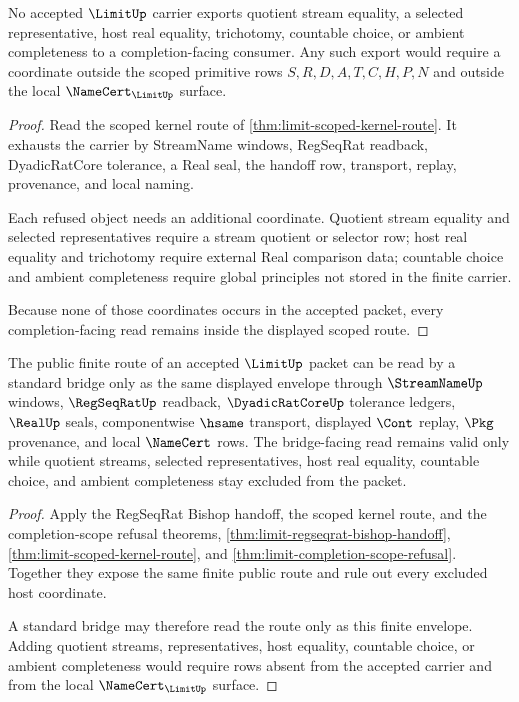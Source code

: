 \begin{theorem}
\label{thm:limit-completion-scope-refusal}
No accepted $\LimitUp$ carrier exports quotient stream equality, a selected representative, host real equality, trichotomy, countable choice, or ambient completeness to a completion-facing consumer. Any such export would require a coordinate outside the scoped primitive rows $S,R,D,A,T,C,H,P,N$ and outside the local $\NameCert_{\LimitUp}$ surface.
\end{theorem}
\begin{proof}
Read the scoped kernel route of \autoref{thm:limit-scoped-kernel-route}. It exhausts the carrier by StreamName windows, RegSeqRat readback, DyadicRatCore tolerance, a Real seal, the handoff row, transport, replay, provenance, and local naming.

Each refused object needs an additional coordinate. Quotient stream equality and selected representatives require a stream quotient or selector row; host real equality and trichotomy require external Real comparison data; countable choice and ambient completeness require global principles not stored in the finite carrier.

Because none of those coordinates occurs in the accepted packet, every completion-facing read remains inside the displayed scoped route.
\end{proof}

\begin{theorem}
\label{thm:limit-standard-bridge-envelope}
The public finite route of an accepted $\LimitUp$ packet can be read by a standard bridge only as the same displayed envelope through $\StreamNameUp$ windows, $\RegSeqRatUp$ readback, $\DyadicRatCoreUp$ tolerance ledgers, $\RealUp$ seals, componentwise $\hsame$ transport, displayed $\Cont$ replay, $\Pkg$ provenance, and local $\NameCert$ rows. The bridge-facing read remains valid only while quotient streams, selected representatives, host real equality, countable choice, and ambient completeness stay excluded from the packet.
\end{theorem}
\begin{proof}
Apply the RegSeqRat Bishop handoff, the scoped kernel route, and the completion-scope refusal theorems, \autoref{thm:limit-regseqrat-bishop-handoff}, \autoref{thm:limit-scoped-kernel-route}, and \autoref{thm:limit-completion-scope-refusal}. Together they expose the same finite public route and rule out every excluded host coordinate.

A standard bridge may therefore read the route only as this finite envelope. Adding quotient streams, representatives, host equality, countable choice, or ambient completeness would require rows absent from the accepted carrier and from the local $\NameCert_{\LimitUp}$ surface.
\end{proof}


